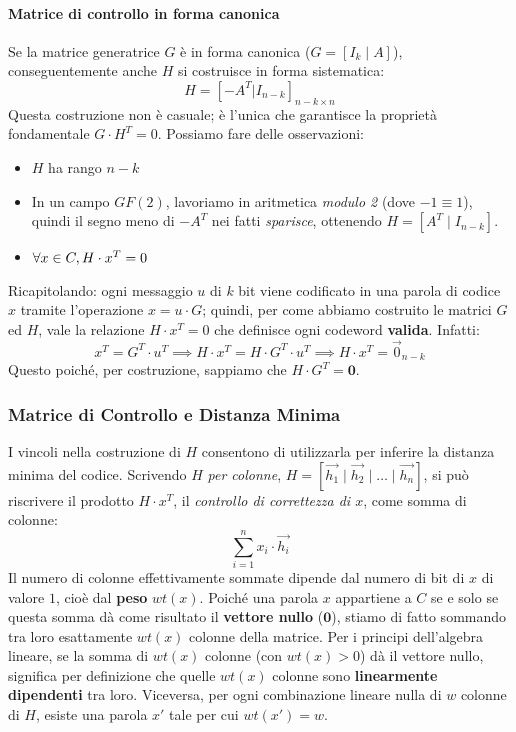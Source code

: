 \paragraph{Matrice di controllo in forma canonica}
Se la matrice generatrice $G$ è in forma canonica ($G = [I_k \mid A]$), conseguentemente anche $H$ si costruisce in forma sistematica:
\[H= [-A^T | I_{n-k}]_{n-k \times n}\]
Questa costruzione non è casuale; è l'unica che garantisce la proprietà fondamentale $G \cdot H^T = 0$.
Possiamo fare delle osservazioni:
\begin{itemize}
    \item $H$ ha rango $n-k$
    \item In un campo $GF(2)$, lavoriamo in aritmetica \textit{modulo 2} (dove $-1 \equiv 1$), quindi il segno meno di $-A^T$ nei fatti \textit{sparisce}, ottenendo $H= [A^T \mid I_{n-k}]$.
    \item $\forall x  \in C, \space H \cdot x^T=0$
\end{itemize}

Ricapitolando: ogni messaggio $u$ di $k$ bit viene codificato in una parola di codice $x$ tramite l'operazione $x= u \cdot G$; quindi, per come abbiamo costruito le matrici $G$ ed $H$, vale la relazione $H \cdot x^T=0$ che definisce ogni codeword \textbf{valida}. Infatti:
\[x^T = G^T \cdot u^T \implies H \cdot x^T= H \cdot G^T \cdot u^T \implies H \cdot x^T=\vec{0}_{n-k}\]
Questo poiché, per costruzione, sappiamo che $H \cdot G^T = \mathbf{0}$.



\subsubsection{Matrice di Controllo e Distanza Minima}
I vincoli nella costruzione di $H$ consentono di utilizzarla per inferire la distanza minima del codice. Scrivendo $H$ \textit{per colonne}, $H=[\vec{h_1} \mid \vec{h_2} \mid \dots \mid \vec{h_n}]$, si può riscrivere il prodotto $H \cdot x^T$, il \textit{controllo di correttezza di $x$}, come somma di colonne:
\[\sum_{i=1}^n x_i \cdot \vec{h_i}\]
Il numero di colonne effettivamente sommate dipende dal numero di bit di $x$ di valore $1$, cioè dal \textbf{peso} $wt(x)$.
Poiché una parola $x$ appartiene a $C$ se e solo se questa somma dà come risultato il \textbf{vettore nullo} ($\mathbf{0}$), stiamo di fatto sommando tra loro esattamente $wt(x)$ colonne della matrice. Per i principi dell'algebra lineare, se la somma di $wt(x)$ colonne (con $wt(x) > 0$) dà il vettore nullo, significa per definizione che quelle $wt(x)$ colonne sono \textbf{linearmente dipendenti} tra loro.
Viceversa, per ogni combinazione lineare nulla di $w$ colonne di $H$, esiste una parola $x'$ tale per cui $wt(x')=w$.

